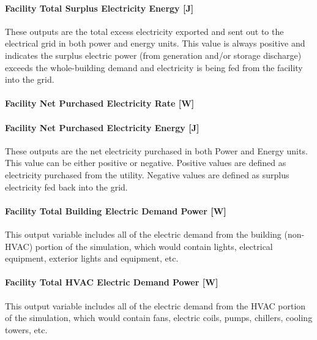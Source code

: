 \paragraph{Facility Total Surplus Electricity Energy {[}J{]}}\label{facility-total-surplus-electric-energy-j}

These outputs are the total excess electricity exported and sent out to the electrical grid in both power and energy units. This value is always positive and indicates the surplus electric power (from generation and/or storage discharge) exceeds the whole-building demand and electricity is being fed from the facility into the grid.

\paragraph{Facility Net Purchased Electricity Rate {[}W{]}}\label{facility-net-purchased-electric-power-w}

\paragraph{Facility Net Purchased Electricity Energy {[}J{]}}\label{facility-net-purchased-electric-energy-j}

These outputs are the net electricity purchased in both Power and Energy units. This value can be either positive or negative. Positive values are defined as electricity purchased from the utility. Negative values are defined as surplus electricity fed back into the grid.

\paragraph{Facility Total Building Electric Demand Power {[}W{]}}\label{facility-total-building-electric-demand-power-w}

This output variable includes all of the electric demand from the building (non-HVAC) portion of the simulation, which would contain lights, electrical equipment, exterior lights and equipment, etc.

\paragraph{Facility Total HVAC Electric Demand Power {[}W{]}}\label{facility-total-hvac-electric-demand-power-w}

This output variable includes all of the electric demand from the HVAC portion of the simulation, which would contain fans, electric coils, pumps, chillers, cooling towers, etc.

